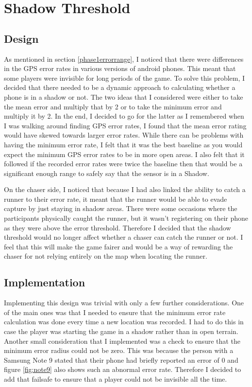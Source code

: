 \documentclass{l4proj}
\begin{document}
\section{Shadow Threshold}

\subsection{Design}
As mentioned in section \ref{phase1errorrange}, I noticed that there were differences in the GPS error rates
in various versions of android phones. This meant that some players were invisible for long periods of the game.
To solve this problem, I decided that there needed to be a dynamic approach to calculating whether a
phone is in a shadow or not. The two ideas that I considered were either to take the mean error and multiply that by 2
or to take the minimum error and multiply it by 2. In the end, I decided to go for the latter as I remembered when 
I was walking around finding GPS error rates, I found that the mean error rating would have skewed towards larger
error rates. While there can be problems with having the minimum error rate, I felt that it was the best baseline
as you would expect the minimum GPS error rates to be in more open areas. I also felt that it followed if the
recorded error rates were twice the baseline then that would be a significant enough range to safely say that
the sensor is in a Shadow.

On the chaser side, I noticed that because I had also linked the ability to catch a runner to their error rate, it
meant that the runner would be able to evade capture by just staying in shadow areas. There were some occasions
where the participants physically caught the runner, but it wasn't registering on their phone as they were above the
error threshold. Therefore I decided that the shadow threshold would no longer affect whether a chaser can catch the
runner or not. I feel that this will make the game fairer and would be a way of rewarding the chaser for not
relying entirely on the map when locating the runner.

\subsection{Implementation}
Implementing this design was trivial with only a few further considerations. One of the main ones was that I
needed to ensure that the minimum error rate calculation was done every time a new location was recorded.
I had to do this in case the player was starting the game in a shadow rather than in open terrain. Another
small consideration that I implemented was a check to ensure that the minimum error radius could not be zero.
This was because the person with a Samsung Note 9 stated that their phone had briefly reported an error of 0 
and figure \ref{fig:note9} also shows such an abnormal error rate. Therefore I decided to add that failsafe to
ensure that a player could not be invisible all the time.  
\end{document}

